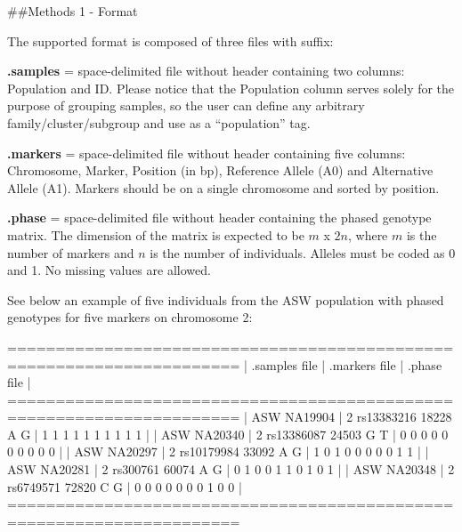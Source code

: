 \documentclass[
]{article}
\newenvironment{Shaded}{}{}
\newcommand{\DecValTok}[1]{#1}
\newcommand{\NormalTok}[1]{#1}
\begin{document}
\pagebreak

\#\#Methods 1 - Format

The supported format is composed of three files with suffix:

\textbf{.samples} = space-delimited file without header containing two
columns: Population and ID. Please notice that the Population column
serves solely for the purpose of grouping samples, so the user can
define any arbitrary family/cluster/subgroup and use as a ``population''
tag.

\textbf{.markers} = space-delimited file without header containing five
columns: Chromosome, Marker, Position (in bp), Reference Allele (A0) and
Alternative Allele (A1). Markers should be on a single chromosome and
sorted by position.

\textbf{.phase} = space-delimited file without header containing the
phased genotype matrix. The dimension of the matrix is expected to be
\(m\) x \(2n\), where \(m\) is the number of markers and \(n\) is the
number of individuals. Alleles must be coded as 0 and 1. No missing
values are allowed.

See below an example of five individuals from the ASW population with
phased genotypes for five markers on chromosome 2:

\begin{Shaded}
\begin{Highlighting}[]
\NormalTok{======================================================================}
\NormalTok{|  .samples file  |      .markers file       |      .phase file      |}
\NormalTok{======================================================================}
\NormalTok{|  ASW NA19904    |  }\DecValTok{2}\NormalTok{ rs13383216 }\DecValTok{18228}\NormalTok{ A G  |  }\DecValTok{1} \DecValTok{1} \DecValTok{1} \DecValTok{1} \DecValTok{1} \DecValTok{1} \DecValTok{1} \DecValTok{1} \DecValTok{1} \DecValTok{1}\NormalTok{  |}
\NormalTok{|  ASW NA20340    |  }\DecValTok{2}\NormalTok{ rs13386087 }\DecValTok{24503}\NormalTok{ G T  |  }\DecValTok{0} \DecValTok{0} \DecValTok{0} \DecValTok{0} \DecValTok{0} \DecValTok{0} \DecValTok{0} \DecValTok{0} \DecValTok{0} \DecValTok{0}\NormalTok{  |}
\NormalTok{|  ASW NA20297    |  }\DecValTok{2}\NormalTok{ rs10179984 }\DecValTok{33092}\NormalTok{ A G  |  }\DecValTok{1} \DecValTok{0} \DecValTok{1} \DecValTok{0} \DecValTok{0} \DecValTok{0} \DecValTok{0} \DecValTok{0} \DecValTok{1} \DecValTok{1}\NormalTok{  |}
\NormalTok{|  ASW NA20281    |  }\DecValTok{2}\NormalTok{ rs300761   }\DecValTok{60074}\NormalTok{ A G  |  }\DecValTok{0} \DecValTok{1} \DecValTok{0} \DecValTok{0} \DecValTok{1} \DecValTok{1} \DecValTok{0} \DecValTok{1} \DecValTok{0} \DecValTok{1}\NormalTok{  |}
\NormalTok{|  ASW NA20348    |  }\DecValTok{2}\NormalTok{ rs6749571  }\DecValTok{72820}\NormalTok{ C G  |  }\DecValTok{0} \DecValTok{0} \DecValTok{0} \DecValTok{0} \DecValTok{0} \DecValTok{0} \DecValTok{0} \DecValTok{1} \DecValTok{0} \DecValTok{0}\NormalTok{  |}
\NormalTok{======================================================================}
\end{Highlighting}
\end{Shaded}
\end{document}
